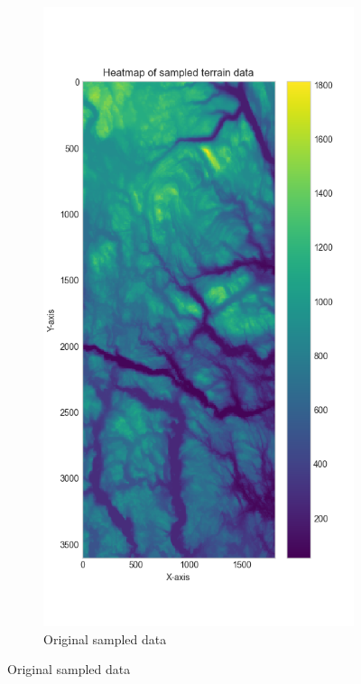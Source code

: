 \begin{figure}[H]
     \begin{subfigure}[h]{0.23\textwidth}
         \includegraphics[width=\textwidth]{Images/sampled_data_heatmap.png}
         \caption{Original sampled data}
         \label{terrain data heatmap}

\end{subfigure}
\end{figure}
